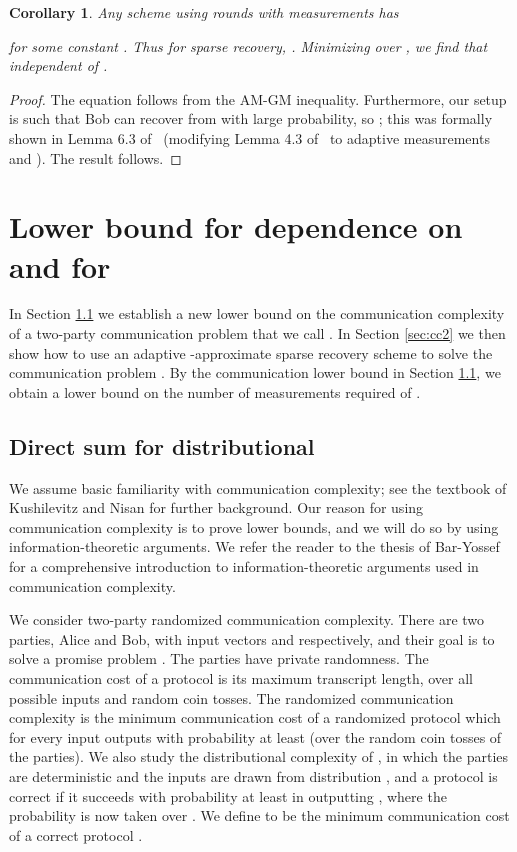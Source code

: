 \documentclass[twoside,leqno,twocolumn]{article}
\newtheorem{corollary}[theorem]{Corollary}
\begin{document}
\begin{corollary}
  Any scheme using  rounds with  measurements has
  
  for some constant .  Thus for sparse recovery, .  Minimizing over , we find that  independent of .
\end{corollary}
\begin{proof}
  The equation follows from the AM-GM inequality.  Furthermore, our
  setup is such that Bob can recover  from  with large
  probability, so ; this was formally
  shown in Lemma 6.3 of~\cite{HIKP12} (modifying Lemma 4.3
  of~\cite{PW11} to adaptive measurements and ).
  The result follows.
\end{proof}


\section{Lower bound for dependence on  and  for }
\label{sec:eps}
In Section
\ref{sec:cc1} we establish a new lower bound on the communication complexity
of a two-party communication problem that we call . 
In Section \ref{sec:cc2} we
then show how to use an adaptive -approximate  sparse
recovery scheme  
to solve the communication problem . 
By the communication lower bound in Section \ref{sec:cc1}, 
we obtain a lower bound on the number of measurements required of . 

\subsection{Direct sum for distributional }\label{sec:cc1}
We assume basic familiarity with communication complexity; see the
textbook of Kushilevitz and Nisan \cite{kn97} for further background.
Our reason for using communication complexity is to prove lower
bounds, and we will do so by using information-theoretic arguments. We
refer the reader to the thesis of Bar-Yossef \cite{BarYossefThesis}
for a comprehensive introduction to information-theoretic arguments
used in communication complexity.

We consider two-party randomized communication complexity. There are two parties,
Alice and Bob, with input vectors  and  respectively, and their goal is
to solve a promise problem . The parties have private randomness. 
The communication cost of a protocol is
its maximum transcript length, over all possible inputs and random coin tosses.
The randomized communication complexity  is 
the minimum communication cost of a randomized protocol  which for every input
 outputs  with probability at least  (over the random
coin tosses of the parties). We also study the distributional
complexity of , in which the parties are deterministic and
the inputs  are drawn from distribution , and a protocol is
correct if it succeeds with probability at least  in outputting ,
where the probability is now taken over . We define 
to be the minimum communication cost of a correct protocol . 
\end{document}

